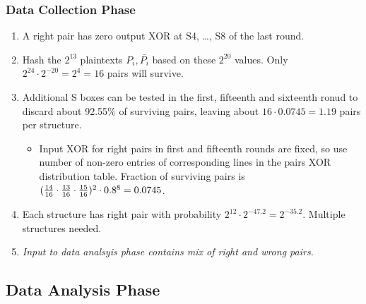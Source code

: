 \documentclass{beamer}
\begin{document}
    \begin{frame}
        \frametitle{Data Collection Phase}
        \begin{enumerate}
            \item<1-> A right pair has zero output XOR at S4, \dots, S8 of the
            last round.
            \item<2-> Hash the \(2^{13}\) plaintexts \(P_i, \bar{P_i}\) based on
            these \(2^{20}\) values. Only \(2^{24} \cdot 2^{-20} = 2^4 = 16\)
            pairs will survive.
            \item<3-> Additional S boxes can be tested in the first, fifteenth
            and sixteenth ronud to discard about 92.55\% of surviving pairs,
            leaving about \(16 \cdot 0.0745 = 1.19\) pairs per structure.
            \begin{itemize}
                \item<4-> Input XOR for right pairs in first and fifteenth
                rounds are fixed, so use number of non-zero entries of
                corresponding lines in the pairs XOR distribution table.
                Fraction of surviving pairs is \((\frac{14}{16} \cdot
                \frac{13}{16} \cdot \frac{15}{16})^2 \cdot 0.8^8 = 0.0745\).
            \end{itemize}
            \item<5-> Each structure has right pair with probability \(2^{12}
            \cdot 2^{-47.2} = 2^{-35.2}\). Multiple structures needed.
            \item<6-> \emph{Input to data analsyis phase contains mix of right
            and wrong pairs.}
        \end{enumerate}
    \end{frame}

    \subsection{Data Analysis Phase}
    \label{subsec:data-analysis}
\end{document}
